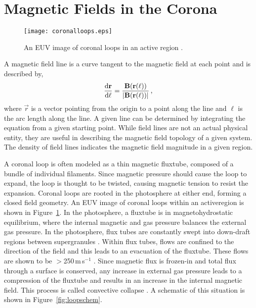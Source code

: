 




\section{Magnetic Fields in the Corona}\label{sect:magcorona}

\begin{figure}[!t]
\centerline{\texttt{[image: coronalloops.eps]}}
\caption[Coronal loops in an active region.]{An EUV image of coronal loops in an active region \citep[from][]{Reale:2010}.}
\label{fig:coronalloops}
\end{figure}

A magnetic field line is a curve tangent to the magnetic field at each point and is described by,
\begin{equation}
\frac{\mathrm{d} \vec{r}}{\mathrm{d} \ell} = \frac{\vec{B}(\vec{r}(\ell))}{|\vec{B}(\vec{r}(\ell))|} \mbox{\,,}
\end{equation}
where $\vec{r}$ is a vector pointing from the origin to a point along the line and $\ell$ is the arc length along the line. A given line can be determined by integrating the equation from a given starting point. While field lines are not an actual physical entity, they are useful in describing the magnetic field topology of a given system. The density of field lines indicates the magnetic field magnitude in a given region.

A coronal loop is often modeled as a thin magnetic \gls{fluxtube}, composed of a bundle of individual filaments. Since magnetic pressure should cause the loop to expand, the loop is thought to be twisted, causing magnetic tension to resist the expansion.
Coronal loops are rooted in the photosphere at either end, forming a closed field geometry. An \gls{EUV} image of coronal loops within an \gls{activeregion} is shown in Figure~\ref{fig:coronalloops}. In the photosphere, a \gls{fluxtube} is in magnetohydrostatic equilibrium, where the internal magnetic and gas pressure balances the external gas pressure. In the photosphere, flux tubes are constantly swept into down-draft regions between supergranules \citep{Simon:1964}. Within flux tubes, flows are confined to the direction of the field and this leads to an evacuation of the \gls{fluxtube}. These flows are shown to be $>$250\,m\,s$^{-1}$ \citep{Solanki:1986}. Since magnetic flux is frozen-in and total flux through a surface is conserved, any increase in external gas pressure leads to a compression of the \gls{fluxtube} and results in an increase in the internal magnetic field. This process is called convective collapse \citep{Roberts:2000}. A schematic of this situation is shown in Figure~\ref{fig:loopschem}.

